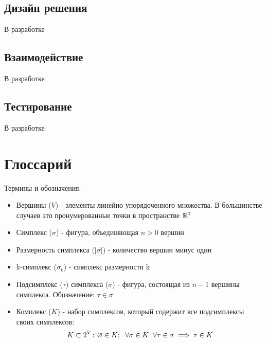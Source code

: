 \documentclass{article}
\begin{document}
\subsection{Дизайн решения}
В разработке
\subsection{Взаимодействие}
В разработке
\subsection{Тестирование}
В разработке
\newpage
\appendix
\section{Глоссарий}\label{glossary}
Термины и обозначения:
\begin{itemize}
  \item Вершины ($V$) - элементы линейно упорядоченного множества. В большинстве случаев это пронумерованные точки в пространстве $\mathbb{R}^3$
  \item Симплекс ($\sigma$) - фигура, объединяющая $n > 0$ вершин
  \item Размерность симплекса ($|\sigma|$) - количество вершин минус один
  \item k-симплекс ($\sigma_k$) - симплекс размерности k
  \item Подсимплекс ($\tau$) симплекса ($\sigma$) - фигура, состоящая из $n - 1$ вершины симплекса. Обозначение: $\tau\in\sigma$
  \item Комплекс ($K$) - набор симплексов, который содержит все подсимплексы своих симплексов:
    \[K\subset 2^V\colon \varnothing\in K;\hspace{0.2cm} \forall \sigma \in K\hspace{0.2cm} \forall \tau\in\sigma\implies \tau \in K\]
\end{itemize}
\newpage



\end{document}
